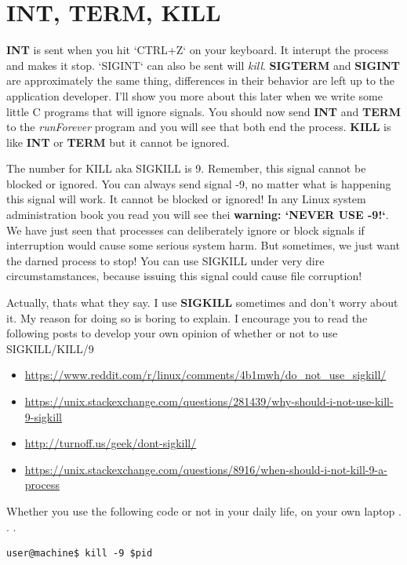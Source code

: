 \documentclass[12pt]{article}
\begin{document}
\section{INT, TERM, KILL}
\textbf{INT} is sent when you hit `CTRL+Z` on your keyboard. It interupt the
process and makes it stop. `SIGINT` can also be sent will \textit{kill}.
\textbf{SIGTERM} and \textbf{SIGINT} are approximately the same thing,
differences in their behavior are left up to the application developer. I'll
show you more about this later when we write some little C programs that will
ignore signals. You should now send \textbf{INT} and \textbf{TERM} to the \textit{runForever} program and you will see that both end the process. \textbf{KILL} is like \textbf{INT} or \textbf{TERM} but it cannot be ignored.

The number for KILL aka SIGKILL is 9. Remember, this signal cannot be blocked or
ignored. You can always send signal -9, no matter what is happening this signal
will work. It cannot be blocked or ignored! In any Linux system administration
book you read you will see thei \textbf{warning: `NEVER USE -9!`}. We have just
seen that processes can deliberately ignore or block signals if interruption
would cause some serious system harm. But sometimes, we just want the darned
process to stop! You can use SIGKILL under very dire circumstamstances, because
issuing this signal could cause file corruption!

Actually, thats what they say. I use \textbf{SIGKILL} sometimes and don't worry about it. My reason for doing so is boring to explain. I encourage you to read the following posts to develop your own opinion of whether or not to use SIGKILL/KILL/9

\begin{itemize}
\item \url{https://www.reddit.com/r/linux/comments/4b1mwh/do_not_use_sigkill/}
\item \url{https://unix.stackexchange.com/questions/281439/why-should-i-not-use-kill-9-sigkill}
\item \url{http://turnoff.us/geek/dont-sigkill/}
\item \url{https://unix.stackexchange.com/questions/8916/when-should-i-not-kill-9-a-process}
\end{itemize}

Whether you use the following code or not in your daily life, on your own laptop . . .

\begin{lstlisting}
user@machine$ kill -9 $pid
\end{lstlisting}
\end{document}
